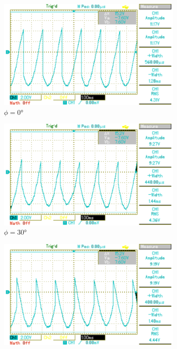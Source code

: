 \begin{figure}[p]
	\centering
	\begin{subfigure}{0.32\textwidth}
		\includegraphics[width=\textwidth]{Bilder/MAP018.pdf}
		\caption{$\phi=0°$}
	\end{subfigure}
	\begin{subfigure}{0.32\textwidth}
		\includegraphics[width=\textwidth]{Bilder/MAP019.pdf}
		\caption{$\phi=30°$}
	\end{subfigure}
	\begin{subfigure}{0.32\textwidth}
		\includegraphics[width=\textwidth]{Bilder/MAP020.pdf}

\end{subfigure}
\end{figure}
